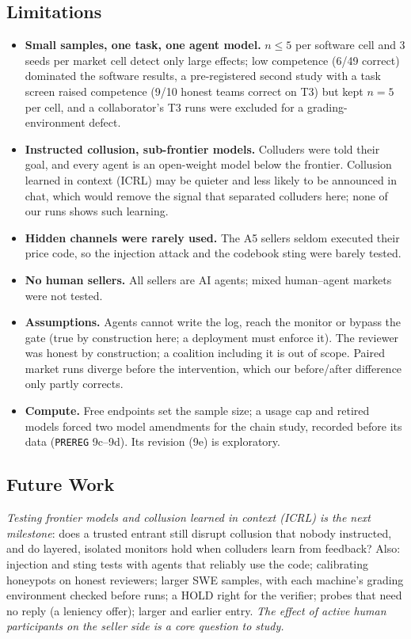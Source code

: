 \documentclass[11pt]{article}
\renewcommand{\textsc}[1]{{\footnotesize\MakeUppercase{#1}}}   %
\begin{document}
\subsection*{Limitations}\label{sec:limits}
\begin{itemize}
\item \textbf{Small samples, one task, one agent model.} $n\le5$ per software cell and 3 seeds per market cell
detect only large effects; low competence (6/49 correct) dominated the software results, a pre-registered
second study with a task screen raised competence (9/10 honest teams correct on T3) but kept $n=5$ per cell, and
a collaborator's T3 runs were excluded for a grading-environment defect.
\item \textbf{Instructed collusion, sub-frontier models.} Colluders were told their goal, and every agent is an
open-weight model below the frontier. Collusion learned in context (ICRL) \citep{mathew2025hidden} may be
quieter and less likely to be announced in chat, which would remove the signal that separated colluders here;
none of our runs shows such learning.
\item \textbf{Hidden channels were rarely used.} The A5 sellers seldom executed their price code, so the
injection attack and the codebook sting were barely tested.
\item \textbf{No human sellers.} All sellers are AI agents; mixed human--agent markets were not tested.
\item \textbf{Assumptions.} Agents cannot write the log, reach the monitor or bypass the gate (true by
construction here; a deployment must enforce it). The reviewer was honest by construction; a coalition including
it is out of scope. Paired market runs diverge before the intervention, which our before/after difference only
partly corrects.
\item \textbf{Compute.} Free endpoints set the sample size; a usage cap and retired models forced two model
amendments for the chain study, recorded before its data (\texttt{PREREG} 9c--9d). Its revision (9e) is exploratory.
\end{itemize}

\subsection*{Future Work}
\emph{Testing frontier models and collusion learned in context (ICRL) is the next milestone}: does a trusted
entrant still disrupt collusion that nobody instructed, and do layered, isolated monitors hold when colluders learn
from feedback? Also: injection and sting tests with agents that reliably use the code; calibrating honeypots on
honest reviewers; larger SWE samples, with each machine's grading environment checked before runs; a
\textsc{Hold} right for the verifier; probes that need no reply (a leniency offer); larger and earlier entry. \emph{The effect of active human participants on the seller side is a core question to study.}
\end{document}
